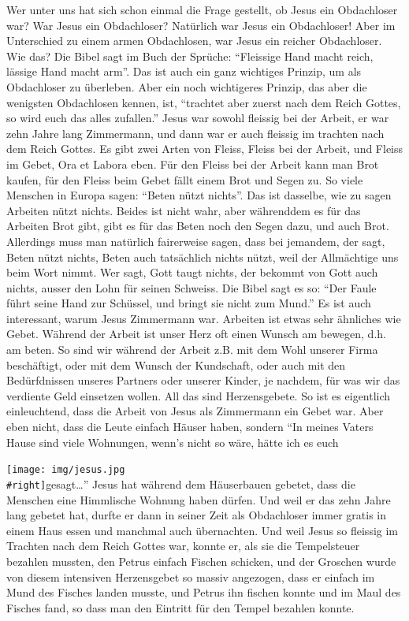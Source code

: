 \documentclass[
]{article}
\begin{document}
Wer unter uns hat sich schon einmal die Frage gestellt, ob Jesus ein
Obdachloser war? War Jesus ein Obdachloser? Natürlich war Jesus ein
Obdachloser! Aber im Unterschied zu einem armen Obdachlosen, war Jesus
ein reicher Obdachloser. Wie das? Die Bibel sagt im Buch der Sprüche:
``Fleissige Hand macht reich, lässige Hand macht arm''. Das ist auch ein
ganz wichtiges Prinzip, um als Obdachloser zu überleben. Aber ein noch
wichtigeres Prinzip, das aber die wenigsten Obdachlosen kennen, ist,
``trachtet aber zuerst nach dem Reich Gottes, so wird euch das alles
zufallen.'' Jesus war sowohl fleissig bei der Arbeit, er war zehn Jahre
lang Zimmermann, und dann war er auch fleissig im trachten nach dem
Reich Gottes. Es gibt zwei Arten von Fleiss, Fleiss bei der Arbeit, und
Fleiss im Gebet, Ora et Labora eben. Für den Fleiss bei der Arbeit kann
man Brot kaufen, für den Fleiss beim Gebet fällt einem Brot und Segen
zu. So viele Menschen in Europa sagen: ``Beten nützt nichts''. Das ist
dasselbe, wie zu sagen Arbeiten nützt nichts. Beides ist nicht wahr,
aber währenddem es für das Arbeiten Brot gibt, gibt es für das Beten
noch den Segen dazu, und auch Brot. Allerdings muss man natürlich
fairerweise sagen, dass bei jemandem, der sagt, Beten nützt nichts,
Beten auch tatsächlich nichts nützt, weil der Allmächtige uns beim Wort
nimmt. Wer sagt, Gott taugt nichts, der bekommt von Gott auch nichts,
ausser den Lohn für seinen Schweiss. Die Bibel sagt es so: ``Der Faule
führt seine Hand zur Schüssel, und bringt sie nicht zum Mund.'' Es ist
auch interessant, warum Jesus Zimmermann war. Arbeiten ist etwas sehr
ähnliches wie Gebet. Während der Arbeit ist unser Herz oft einen Wunsch
am bewegen, d.h. am beten. So sind wir während der Arbeit z.B. mit dem
Wohl unserer Firma beschäftigt, oder mit dem Wunsch der Kundschaft, oder
auch mit den Bedürfdnissen unseres Partners oder unserer Kinder, je
nachdem, für was wir das verdiente Geld einsetzen wollen. All das sind
Herzensgebete. So ist es eigentlich einleuchtend, dass die Arbeit von
Jesus als Zimmermann ein Gebet war. Aber eben nicht, dass die Leute
einfach Häuser haben, sondern ``In meines Vaters Hause sind viele
Wohnungen, wenn's nicht so wäre, hätte ich es euch

\texttt{[image: img/jesus.jpg\\\#right]}gesagt\ldots'' Jesus hat während
dem Häuserbauen gebetet, dass die Menschen eine Himmlische Wohnung haben
dürfen. Und weil er das zehn Jahre lang gebetet hat, durfte er dann in
seiner Zeit als Obdachloser immer gratis in einem Haus essen und
manchmal auch übernachten. Und weil Jesus so fleissig im Trachten nach
dem Reich Gottes war, konnte er, als sie die Tempelsteuer bezahlen
mussten, den Petrus einfach Fischen schicken, und der Groschen wurde von
diesem intensiven Herzensgebet so massiv angezogen, dass er einfach im
Mund des Fisches landen musste, und Petrus ihn fischen konnte und im
Maul des Fisches fand, so dass man den Eintritt für den Tempel bezahlen
konnte.
\end{document}

